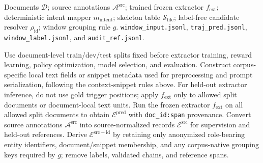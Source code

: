 \documentclass{article}
\begin{document}
\begin{algorithm}[!htbp]
\caption{Deterministic construction of ranking windows and candidate trajectories.}
\label{alg:window_construction}
\begin{algorithmic}[1]
\REQUIRE Documents $\mathcal{D}$; source annotations $\mathcal{A}^{\mathrm{src}}$; trained frozen extractor $f_{\mathrm{ext}}$; deterministic intent mapper $m_{\mathrm{intent}}$; skeleton table $\mathcal{S}_{\mathrm{file}}$; label-free candidate resolver $\rho_{\mathrm{id}}$; window grouping rule $g$.
\ENSURE \texttt{window\_input.jsonl}, \texttt{traj\_pred.jsonl}, \texttt{window\_label.jsonl}, and \texttt{audit\_ref.jsonl}.

\STATE Use document-level train/dev/test splits fixed before extractor training, reward learning, policy optimization, model selection, and evaluation.
\STATE Construct corpus-specific local text fields or snippet metadata used for preprocessing and prompt serialization, following the context-snippet rules above.
\STATE For held-out extractor inference, do not use gold trigger positions; apply $f_{\mathrm{ext}}$ only to allowed split documents or document-local text units.
\STATE Run the frozen extractor $f_{\mathrm{ext}}$ on all allowed split documents to obtain $\mathcal{E}^{\mathrm{pred}}$ with \texttt{doc\_id:span} provenance.
\STATE Convert source annotations $\mathcal{A}^{\mathrm{src}}$ into source-normalized records $\mathcal{E}^{\mathrm{src}}$ for supervision and held-out references.
\STATE Derive $\mathcal{E}^{\mathrm{src-id}}$ by retaining only anonymized role-bearing entity identifiers, document/snippet membership, and any corpus-native grouping keys required by $g$; remove labels, validated chains, and reference spans.


\end{algorithmic}
\end{algorithm}
\end{document}
